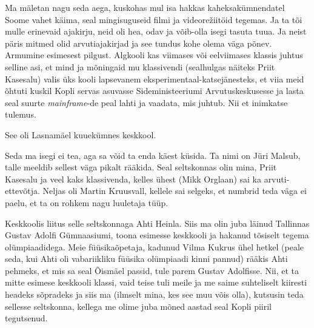 

Ma mäletan nagu seda aega, kuskohas mul isa hakkas kaheksakümnendatel Soome vahet käima, seal mingisuguseid
filmi ja videorežiitöid tegemas. Ja ta tõi mulle erinevaid ajakirju, neid oli hea, odav ja võib-olla isegi tasuta tuua. Ja neist päris mitmed olid arvutiajakirjad ja see tundus kohe olema väga põnev. Armumine esimesest pilgust. Algkooli kas  viimases või eelviimases klassis juhtus selline asi, et mind ja mõningaid mu klassivendi (sealhulgas näiteks Priit Kasesalu) valis üks kooli lapsevanem eksperimentaal-katsejänesteks, et viia  meid õhtuti  kuskil Kopli servas asuvasse Sideministeeriumi Arvutuskeskusesse ja lasta seal suurte \emph{mainframe}-de peal lahti ja vaadata, mis juhtub. Nii et inimkatse tulemus. 


See oli Lasnamäel kuuekümnes keskkool.


Seda ma isegi ei tea, aga sa võid ta enda käest küsida. Ta nimi on Jüri Malsub, talle meeldib sellest väga pikalt rääkida. Seal seltskonnas olin mina, Priit Kasesalu ja veel kaks klassivenda, kelles ühest (Mikk Orglaan) sai ka arvuti-ettevõtja. Neljas oli Martin Kruusvall, kellele sai selgeks, et numbrid teda väga ei paelu, et ta on rohkem nagu luuletaja tüüp. 

Keskkoolis liitus selle seltskonnaga Ahti Heinla. Siis ma olin juba läinud Tallinnas Gustav Adolfi Gümnaasiumi, toona esimesse keskkooli ja hakanud tõsiselt tegema olümpiaadidega. Meie füüsikaõpetaja, kadunud Vilma Kukrus ühel hetkel (peale seda, kui Ahti oli vabariikliku füüsika olümpiaadi kinni pannud) rääkis Ahti pehmeks, et mis sa seal Õismäel passid, tule parem Gustav Adolfisse. Nii, et ta mitte esimese keskkooli klassi, vaid  teise  tuli meile ja me saime suhteliselt kiiresti headeks sõpradeks ja siis ma (ilmselt mina, kes see muu võis olla), kutsusin teda sellesse seltskonna, kellega me olime juba  mõned aastad seal Kopli piiril tegutsenud. 


